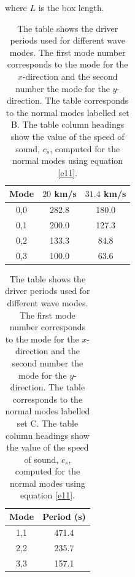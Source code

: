 \documentclass[preprint,authoryear,12pt]{elsarticle}
\begin{document}
where $L$ is the box length.
\begin{table}
\centering
\begin{tabular}{c c c }
\hline
Mode &  $20$ km/s &  $
31.4$ km/s \\
\hline
0,0  & 282.8 & 180.0 \\
\hline
0,1  & 200.0 & 127.3  \\
\hline
0,2  & 133.3 & 84.8  \\
\hline
0,3  & 100.0 & 63.6  \\
\hline
\end{tabular} 
\caption{The table shows the driver periods used for different wave modes. The first mode number corresponds to the mode for the $x$-direction and the second number the mode for the $y$-direction. The table corresponds to the normal modes labelled set B. The table column headings show the value of the speed of sound, $c_s$, computed for the normal modes using equation \ref{e11}. }
\label{Table2}
\end{table}

\begin{table}\label{simcperiods}
\centering
\begin{tabular}{c c }
\hline
Mode   &  Period (s) \\
\hline
1,1 & 471.4  \\
\hline
2,2 & 235.7   \\
\hline
3,3 & 157.1   \\
\hline

\end{tabular} 
\caption{The table shows the driver periods used for different wave modes. The first mode number corresponds to the mode for the $x$-direction and the second number the mode for the $y$-direction. The table corresponds to the normal modes labelled set C. The table column headings show the value of the speed of sound, $c_s$, computed for the normal modes using equation \ref{e11}.}
\label{Tableamps_equalmodenumber}
\end{table}
\end{document}
